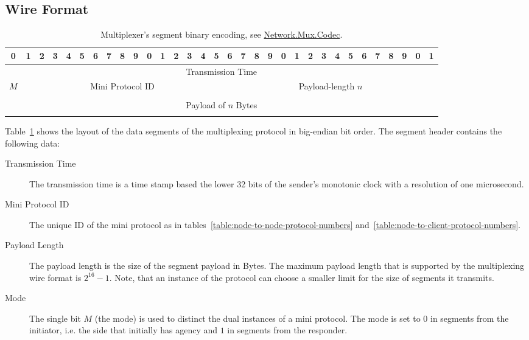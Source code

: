 \subsection{Wire Format}
\label{section:wire-format}

\begin{table}
  \begin{center}
    \begingroup
    \setlength{\tabcolsep}{3pt}
    \begin{tabular}{|c|c|c|c|c|c|c|c|c|c|c|c|c|c|c|c|c|c|c|c|c|c|c|c|c|c|c|c|c|c|c|c|}
      \hline
      0&1&2&3&4&5&6&7&8&9&0&1&2&3&4&5&6&7&8&9&0&1&2&3&4&5&6&7&8&9&0&1 \\ \hline
      \multicolumn{32}{|c|}{Transmission Time} \\ \hline
      \multicolumn{1}{|c|}{$M$}
      &\multicolumn{15}{|c|}{Mini Protocol ID}
      &\multicolumn{16}{|c|}{Payload-length $n$} \\ \hline
      \multicolumn{32}{|c|}{} \\
      \multicolumn{32}{|c|}{Payload of $n$ Bytes} \\
      \multicolumn{32}{|c|}{} \\ \hline
    \end{tabular}
    \endgroup
    \caption{Multiplexer's segment binary encoding, see
    \href{https://The-Blockchain-Company.github.io/shardagnostic-network/network-mux/Network-Mux-Codec}{Network.Mux.Codec}.}
    \label{segment-header}
  \end{center}
\end{table}

Table~\ref{segment-header} shows the layout of the data segments of the multiplexing protocol
in big-endian bit order.  The segment header contains the following data:
\begin{description}
\item[Transmission Time]
  The transmission time is a time stamp based the lower 32 bits of the sender's monotonic clock with a
  resolution of one microsecond.
\item[Mini Protocol ID] The unique ID of the mini protocol as in
  tables~\ref{table:node-to-node-protocol-numbers}
    and~\ref{table:node-to-client-protocol-numbers}.
\item[Payload Length] The payload length is the size of the segment payload in Bytes.
  The maximum payload length that is supported by the multiplexing wire format is $2^{16}-1$.
  Note, that an instance of the protocol can choose a smaller limit for the size of segments it transmits.
\item[Mode] The single bit $M$ (the mode) is used to distinct the dual instances of a mini protocol.
  The mode is set to $0$ in segments from the initiator, i.e. the side that initially has agency and
  $1$ in segments from the responder.
\end{description}

